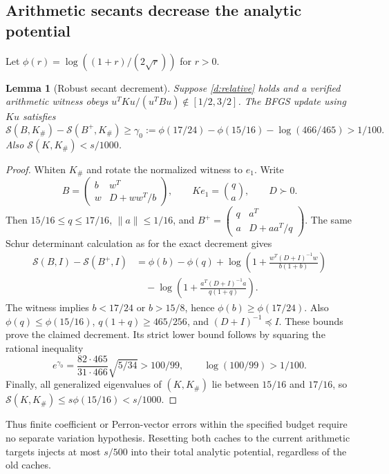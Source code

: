 \documentclass[11pt]{amsart}
\newtheorem{lemma}[theorem]{Lemma}
\theoremstyle{definition}\newtheorem{definition}[theorem]{Definition}
\theoremstyle{remark}\newtheorem{remark}[theorem]{Remark}
\numberwithin{equation}{section}
\begin{document}
\subsection{Arithmetic secants decrease the analytic potential}
\label{d:robust-drop}
Let $\phi(r)=\log((1+r)/(2\sqrt r))$ for $r>0$.
\begin{lemma}[Robust secant decrement]\label{d:drop}
Suppose \eqref{d:relative} holds and a verified arithmetic witness obeys
$u^TKu/(u^TBu)\notin[1/2,3/2]$. The BFGS update using $Ku$ satisfies
\[
 \mathcal S(B,K_\#)-\mathcal S(B^+,K_\#)
 \ge\gamma_0:=\phi(17/24)-\phi(15/16)-\log(466/465)>1/100.
\]
Also $\mathcal S(K,K_\#)<s/1000$.
\end{lemma}
\begin{proof}
Whiten $K_\#$ and rotate the normalized witness to $e_1$. Write
\[
 B=\begin{pmatrix}b&w^T\\w&D+ww^T/b\end{pmatrix},\qquad
 Ke_1=\binom{q}{a},\qquad D\succ0.
\]
Then $15/16\le q\le17/16$, $\|a\|\le1/16$, and
$B^+=\left(\begin{smallmatrix}q&a^T\\a&D+aa^T/q\end{smallmatrix}\right)$.
The same Schur determinant calculation as for the exact decrement gives
\begin{align*}
 \mathcal S(B,I)-\mathcal S(B^+,I)
 &=\phi(b)-\phi(q)
 +\log\left(1+\frac{w^T(D+I)^{-1}w}{b(1+b)}\right)\\
 &\quad-\log\left(1+\frac{a^T(D+I)^{-1}a}{q(1+q)}\right).
\end{align*}
The witness implies $b<17/24$ or $b>15/8$, hence
$\phi(b)\ge\phi(17/24)$. Also
$\phi(q)\le\phi(15/16)$, $q(1+q)\ge465/256$, and $(D+I)^{-1}\preceq I$.
These bounds prove the claimed decrement. Its strict lower bound follows
by squaring the rational inequality
\[
 e^{\gamma_0}=\frac{82\cdot465}{31\cdot466}\sqrt{5/34}>100/99,
 \qquad \log(100/99)>1/100.
\]
Finally, all generalized eigenvalues of $(K,K_\#)$ lie between $15/16$
and $17/16$, so $\mathcal S(K,K_\#)\le s\phi(15/16)<s/1000$.
\end{proof}

Thus finite coefficient or Perron-vector errors within the specified
budget require no separate variation hypothesis. Resetting both caches to
the current arithmetic targets injects at most $s/500$ into their total
analytic potential, regardless of the old caches.
\end{document}
